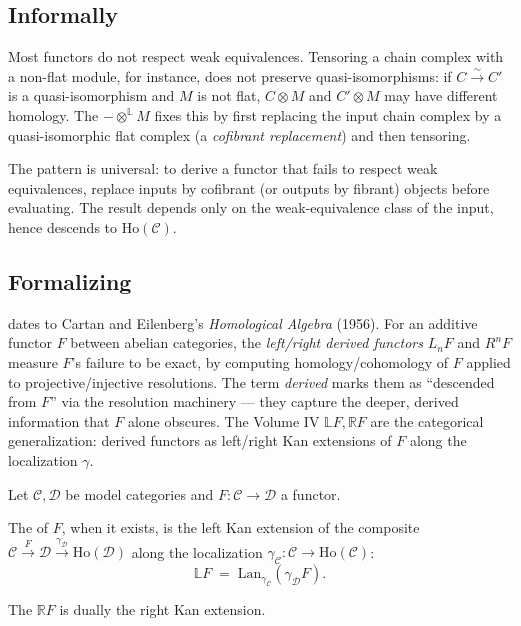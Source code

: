 \subsection{Informally}

Most functors do not respect weak equivalences. Tensoring a chain complex
with a non-flat module, for instance, does not preserve quasi-isomorphisms:
if $C \xrightarrow{\sim} C'$ is a quasi-isomorphism and $M$ is not flat,
$C \otimes M$ and $C' \otimes M$ may have different homology. The
 $- \otimes^{\mathbb{L}} M$ fixes this by
first replacing the input chain complex by a quasi-isomorphic flat
complex (a \emph{cofibrant replacement}) and then tensoring.

The pattern is universal: to derive a functor that fails to respect
weak equivalences, replace inputs by cofibrant (or outputs by fibrant)
objects before evaluating. The result depends only on the weak-equivalence
class of the input, hence descends to $\mathrm{Ho}(\mathcal{C})$.

\subsection{Formalizing}

\begin{nameorigin}
 dates to Cartan and Eilenberg's \emph{Homological
Algebra} (1956). For an additive functor $F$ between abelian categories,
the \emph{left/right derived functors} $L_n F$ and $R^n F$ measure $F$'s
failure to be exact, by computing homology/cohomology of $F$ applied to
projective/injective resolutions. The term \emph{derived} marks them
as ``descended from $F$'' via the resolution machinery — they capture
the deeper, derived information that $F$ alone obscures. The Volume IV
$\mathbb{L} F, \mathbb{R} F$ are the categorical generalization: derived
functors as left/right Kan extensions of $F$ along the localization
$\gamma$.
\end{nameorigin}

\begin{definition}
\label{def:total-derived}
Let $\mathcal{C}, \mathcal{D}$ be model categories and $F : \mathcal{C}
\to \mathcal{D}$ a functor.

The  of $F$, when it exists, is the
left Kan extension of the composite $\mathcal{C} \xrightarrow{F}
\mathcal{D} \xrightarrow{\gamma_{\mathcal{D}}} \mathrm{Ho}(\mathcal{D})$
along the localization $\gamma_{\mathcal{C}} : \mathcal{C} \to
\mathrm{Ho}(\mathcal{C})$:
\begin{equation*}
  \mathbb{L} F \;=\; \mathrm{Lan}_{\gamma_{\mathcal{C}}} (\gamma_{\mathcal{D}} F).
\end{equation*}

The  $\mathbb{R} F$ is dually the right
Kan extension.
\end{definition}

